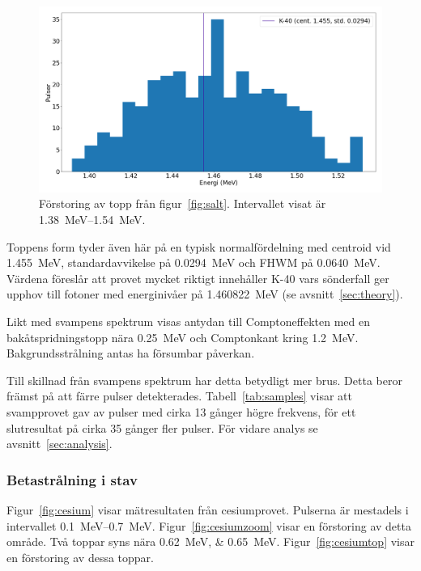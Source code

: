 \begin{figure}[!hp]
    \centering
    \includegraphics[width=\textwidth, keepaspectratio]{../images/salt_top.png}
    \caption{
        Förstoring av topp från figur~\ref{fig:salt}.
        Intervallet visat är \qtyrange{1.38}{1.54}{\MeV}.
    }
    \label{fig:salttop}
\end{figure}

Toppens form tyder även här på en typisk normalfördelning med centroid vid
\qty{1.455}{\MeV}, standardavvikelse på \qty{0.0294}{\MeV} och FHWM på
\qty{0.0640}{\MeV}. Värdena föreslår att provet mycket riktigt innehåller K-40
vars sönderfall ger upphov till fotoner med energinivåer på
\qty{1.460822}{\MeV} (se avsnitt~\ref{sec:theory}).

Likt med svampens spektrum visas antydan till Comptoneffekten med en
bakåtspridningstopp nära \qty{0.25}{\MeV} och Comptonkant kring
\qty{1.2}{\MeV}. Bakgrundsstrålning antas ha försumbar påverkan.

Till skillnad från svampens spektrum har detta betydligt mer brus. Detta beror
främst på att färre pulser detekterades. Tabell~\ref{tab:samples} visar att
svampprovet gav av pulser med cirka \num{13} gånger högre frekvens, för ett
slutresultat på cirka \num{35} gånger fler pulser. För vidare analys se
avsnitt~\ref{sec:analysis}.

\subsubsection{Betastrålning i stav}

Figur~\ref{fig:cesium} visar mätresultaten från cesiumprovet. Pulserna är
mestadels i intervallet \qtyrange{0.1}{0.7}{\MeV}. Figur~\ref{fig:cesiumzoom}
visar en förstoring av detta område. Två toppar syns nära
\qtylist{0.62;0.65}{\MeV}. Figur~\ref{fig:cesiumtop} visar en förstoring av
dessa toppar.

